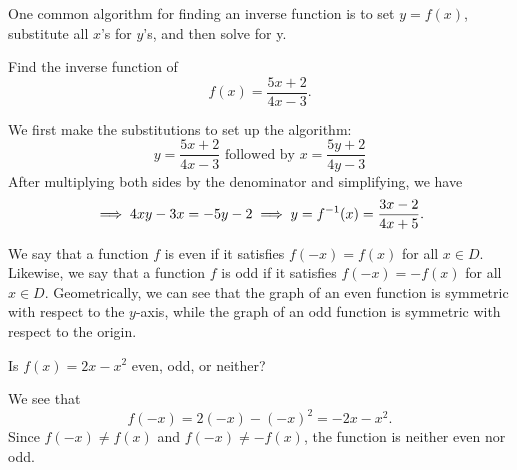 One common algorithm for finding an inverse function is to set $y = f(x)$, substitute all $x$'s for $y$'s, and then solve for y.
\begin{example}
    Find the inverse function of 
    \begin{equation*}
        f(x) = \frac{5x + 2}{4x - 3}.
    \end{equation*}
\end{example}
\begin{answer}
    We first make the substitutions to set up the algorithm:
    \begin{equation*}
        y = \frac{5x + 2}{4x - 3} \text{ followed by }
        x = \frac{5y + 2}{4y - 3}
    \end{equation*}
    After multiplying both sides by the denominator and simplifying, we have
    \begin{equation*}
        \implies 4xy - 3x = -5y - 2 \\
        \implies y = f^{-1}(x) = \frac{3x - 2}{4x + 5}.
    \end{equation*}
\end{answer}

We say that a function $f$ is even if it satisfies $f(-x) = f(x)$ for all $x \in D$.
Likewise, we say that a function $f$ is odd if it satisfies $f(-x) = -f(x)$ for all $x \in D$. 
Geometrically, we can see that the graph of an even function is symmetric with respect to the $y$-axis, while the graph of an odd function is symmetric with respect to the origin. 

\begin{example}
    Is $f(x) = 2x - x^2$ even, odd, or neither?
\end{example}
\begin{answer}
	We see that
    \begin{equation*}
        f(-x) = 2(-x) - (-x)^2 = -2x - x^2.
    \end{equation*}
    Since $f(-x) \neq f(x)$ and $f(-x) \neq -f(x)$, the function is neither even nor odd.
\end{answer}